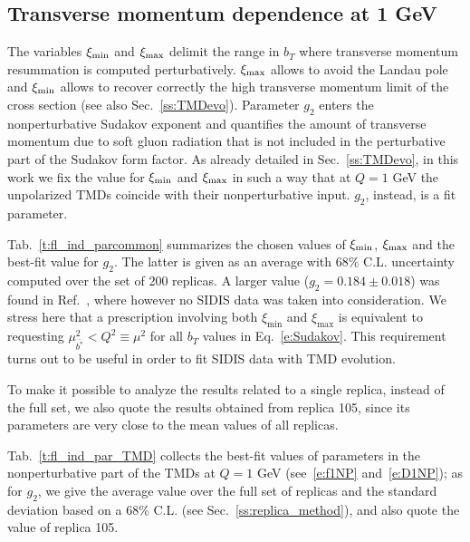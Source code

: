 \documentclass[aps,preprintnumbers,showpacs,nofootinbib,superscriptaddress,floatfix]{revtex4}
\newcommand{\bb}{\xi}
\begin{document}
\subsection{Transverse momentum dependence at 1 GeV}
\label{ss:bestfit_TMDs}

The variables $\bb_{\rm min}$ and $\bb_{\rm max}$ delimit the range in $b_T$ where transverse momentum resummation is computed perturbatively. $\bb_{\rm max}$ allows to avoid the Landau pole and $\bb_{\rm min}$ allows to recover correctly the high transverse momentum limit of the cross section (see also Sec.~\ref{ss:TMDevo}).
Parameter $g_2$ enters the nonperturbative Sudakov exponent and
quantifies the amount of transverse momentum 
due to soft gluon radiation that is not included in the
perturbative part of the Sudakov form factor.
As already detailed in Sec.~\ref{ss:TMDevo}, in this work we fix the value for
$\bb_{\rm min}$ and $\bb_{\rm max}$ in such a way that at $Q=1$ GeV the
unpolarized TMDs coincide with their nonperturbative input. $g_2$, instead, is
a fit parameter. 

Tab.~\ref{t:fl_ind_parcommon} summarizes the chosen values of $\bb_{\rm min}$,
$\bb_{\rm max}$ and the best-fit value for $g_2$. The latter is given as an
average with $68\%$ C.L. uncertainty computed over the set of 200 replicas. A
larger value ($g_2 = 0.184 \pm 0.018$) was found in Ref.~\cite{Konychev:2005iy},
where however no SIDIS data was taken into consideration.
We stress here that a prescription involving both $\bb_{\text{min}}$ and
$\bb_{\text{max}}$ is equivalent to requesting $\mu_{\bar{b^*}}^2 < Q^2 \equiv
\mu^2$ for all $b_T$ values in Eq.~\eqref{e:Sudakov}. This requirement turns out
to be useful in order to fit SIDIS data with TMD evolution.

To make it possible to analyze the results related to a single replica,
instead of the full set, we also quote the results obtained from
replica 105, since its parameters are very close to the
mean values of all replicas. 

Tab.~\ref{t:fl_ind_par_TMD} collects the best-fit values of parameters in the
nonperturbative part of the TMDs at $Q=1$ GeV (see~\eqref{e:f1NP}
and~\eqref{e:D1NP}); as for $g_2$, we give the average value over the full set
of replicas and the standard deviation based on a $68\%$ C.L. (see
Sec.~\ref{ss:replica_method}), and also quote the value of replica 105.
\end{document}
